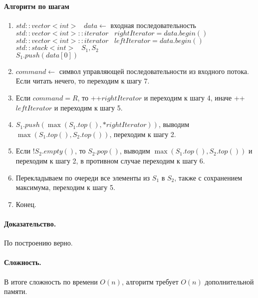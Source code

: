 \documentclass[12pt]{article}
\begin{document}
\paragraph{Алгоритм по шагам}
\begin{enumerate}
    \item $ std::vector<int> \;\;\; data \leftarrow $ входная последовательность \\
          $ std::vector<int>::iterator \;\;\; rightIterator = data.begin() $ \\
          $ std::vector<int>::iterator \;\;\; leftIterator = data.begin() $ \\
          $ std::stack<int> \;\;\; S_1, S_2 $ \\
          $ S_1.push(data[0]) $
    \item $ command \leftarrow $ символ управляющей последовательности из входного потока.
          Если читать нечего, то переходим к шагу 7.
    \item Если $ command = R $, то   ++$rightIterator $ и переходим к шагу 4, иначе ++$leftIterator$ и переходим к шагу 5.
    \item $ S_1.push(\max(S_1.top(), *rightIterator)) $, выводим $ \max(S_1.top(), S_2.top()) $, переходим к шагу 2.
    \item Если $ ! S_2.empty() $, то $ S_2.pop() $, выводим $ \max(S_1.top(), S_2.top()) $ и переходим к шагу 2,
          в противном случае переходим к шагу 6.
    \item Перекладываем по очереди все элементы из $ S_1 $ в $ S_2 $, также с сохранением максимума, переходим к шагу 5.
    \item Конец.
\end{enumerate}


\paragraph{Доказательство.}
По построению верно.


\paragraph{Сложность.}
В итоге сложность по времени $ O(n) $, алгоритм требует $ O(n) $ дополнительной памяти.
\end{document}
